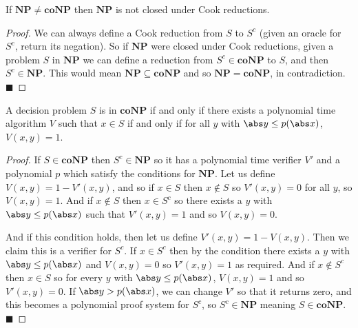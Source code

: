 \documentclass[10pt]{article}
\def\NP{\mathbf{NP}}
\def\coNP{\mathbf{coNP}}
\def\qed{%
    \ifmmode%
        \eqno\blacksquare%
    \else%
        \hskip1cm\allowbreak\hbox{}\nobreak\hfill$\blacksquare$%
    \fi%
}
\begin{document}


\bigskip

\begin{prop*}

    If $\NP\neq\coNP$ then $\NP$ is not closed under Cook reductions.

\end{prop*}

\begin{proof}

    We can always define a Cook reduction from $S$ to $S^c$ (given an oracle for $S^c$, return its negation).
    So if $\NP$ were closed under Cook reductions, given a problem $S$ in $\NP$ we can define a reduction from $S^c\in\coNP$ to $S$, and then $S^c\in\NP$.
    This would mean $\NP\subseteq\coNP$ and so $\NP=\coNP$, in contradiction.
    \qed

\end{proof}

\begin{prop*}

    A decision problem $S$ is in $\coNP$ if and only if there exists a polynomial time algorithm $V$ such that $x\in S$ if and only if for all $y$ with $\abs y\leq p(\abs x)$, $V(x,y)=1$.

\end{prop*}

\begin{proof}

    If $S\in\coNP$ then $S^c\in\NP$ so it has a polynomial time verifier $V'$ and a polynomial $p$ which satisfy the conditions for $\NP$.
    Let us define $V(x,y)=1-V'(x,y)$, and so if $x\in S$ then $x\notin S$ so $V'(x,y)=0$ for all $y$, so $V(x,y)=1$.
    And if $x\notin S$ then $x\in S^c$ so there exists a $y$ with $\abs y\leq p(\abs x)$ such that $V'(x,y)=1$ and so $V(x,y)=0$.

    And if this condition holds, then let us define $V'(x,y)=1-V(x,y)$.
    Then we claim this is a verifier for $S^c$.
    If $x\in S^c$ then by the condition there exists a $y$ with $\abs y\leq p(\abs x)$ and $V(x,y)=0$ so $V'(x,y)=1$ as required.
    And if $x\notin S^c$ then $x\in S$ so for every $y$ with $\abs y\leq p(\abs x)$, $V(x,y)=1$ and so $V'(x,y)=0$.
    If $\abs y>p(\abs x)$, we can change $V'$ so that it returns zero, and this becomes a polynomial proof system for $S^c$, so $S^c\in\NP$ meaning $S\in\coNP$.
    \qed

\end{proof}
\end{document}
